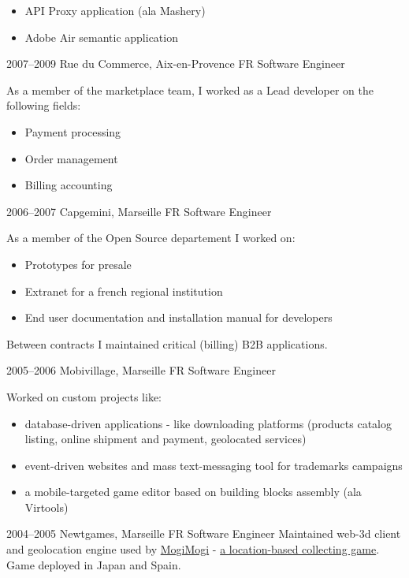 \documentclass[]{friggeri}
\begin{document}
\begin{entrylist}
{\begin{itemize}
    \item API Proxy application (ala Mashery)
    \item Adobe Air semantic application
    \end{itemize}}
  \entry
    {2007–2009}
    {Rue du Commerce, Aix-en-Provence FR}
    {Software Engineer}
    {As a member of the marketplace team, I worked as a Lead developer on the
    following fields:
    \begin{itemize}
    \item Payment processing
    \item Order management
    \item Billing accounting
    \end{itemize}}
\end{entrylist}

\clearpage

\begin{entrylist}
  \entry
    {2006–2007}
    {Capgemini, Marseille FR}
    {Software Engineer}
    {As a member of the Open Source departement I worked on:
    \begin{itemize}
    \item Prototypes for presale
    \item Extranet for a french regional institution
    \item End user documentation and installation manual for developers
    \end{itemize}
    Between contracts I maintained critical (billing) B2B applications.}
  \entry
    {2005–2006}
    {Mobivillage, Marseille FR}
    {Software Engineer}
    {Worked on custom projects like:
    \begin{itemize}
    \item database-driven applications - like downloading platforms
    (products catalog listing, online shipment and payment, geolocated services)
    \item event-driven websites and mass text-messaging tool for
    trademarks campaigns
    \item a mobile-targeted game editor based on building blocks
    assembly (ala Virtools)
    \end{itemize}}
  \entry
    {2004–2005}
    {Newtgames, Marseille FR}
    {Software Engineer}
    {Maintained web-3d client and geolocation engine used by
    \href{http://mogimogi.com}{MogiMogi} - \href{http://thefeaturearchives.com/100501.html}{a location-based collecting game}.
    Game deployed in Japan and Spain.}
\end{entrylist}
\end{document}

